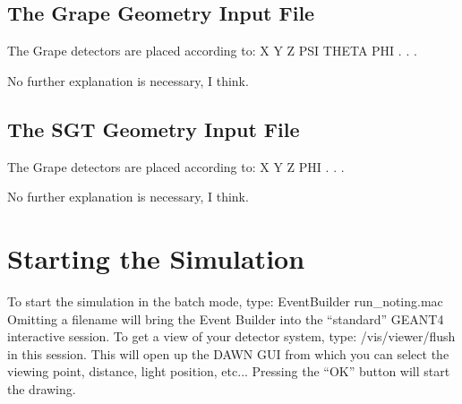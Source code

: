 \documentclass[12pt]{book}
\begin{document}
\subsection{The Grape Geometry Input File}

The Grape detectors are placed according to:\hfill{}
\linebreak
\linebreak
{\ttfamily X Y Z PSI THETA PHI}\linebreak
{\ttfamily .}\linebreak
{\ttfamily .}\linebreak
{\ttfamily .}\linebreak
\linebreak
\linebreak

No further explanation is necessary, I think.

\subsection{The SGT Geometry Input File}

The Grape detectors are placed according to:\hfill{}
\linebreak
\linebreak
{\ttfamily X Y Z PHI}\linebreak
{\ttfamily .}\linebreak
{\ttfamily .}\linebreak
{\ttfamily .}\linebreak
\linebreak
\linebreak

No further explanation is necessary, I think.

\section{Starting the Simulation}
To start the simulation in the batch mode, type:\hfill{}
\linebreak
\linebreak
{\ttfamily
EventBuilder run\_noting.mac
}
\linebreak
\linebreak
Omitting a filename will bring the Event Builder into the ``standard'' GEANT4 interactive session. 
To get a view of your detector system, type:\hfill{}
\linebreak
\linebreak
{\ttfamily
/vis/viewer/flush
}
\linebreak
\linebreak
in this session. This will open up the DAWN GUI from which you can select the viewing point, distance, 
light position, etc... Pressing the ``OK'' button will start the drawing.\\
\end{document}
